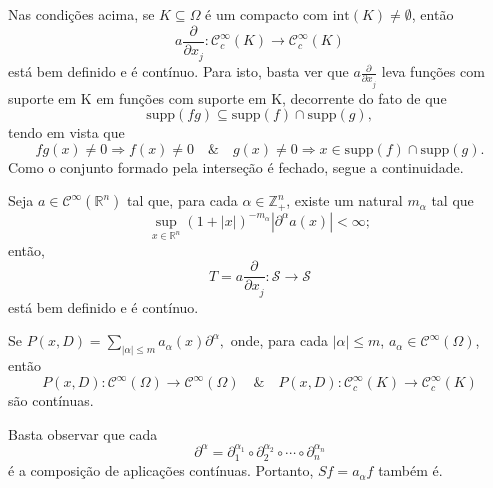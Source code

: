\documentclass[../distribution_theory_notes.tex]{subfiles}
\begin{document}
\begin{example}
	Nas condições acima, se \(K\subseteq \Omega \) é um compacto com \(\mathrm{int}(K)\neq\emptyset\), então
	\[
		a \frac{\partial^{}}{\partial x_{j}^{}}:\mathcal{C}_{c}^{\infty}(K)\rightarrow \mathcal{C}_{c}^{\infty}(K)
	\]
	está bem definido e é contínuo. Para isto, basta ver que \(a \frac{\partial^{}}{\partial x_{j}^{}}\) leva funções com suporte em K em funções com suporte em K, decorrente do fato de que
	\[
		\mathrm{supp}(fg)\subseteq \mathrm{supp}(f)\cap \mathrm{supp}(g),
	\]
	tendo em vista que
	\[
		fg(x)\neq 0 \Rightarrow f(x)\neq 0 \quad\&\quad g(x)\neq 0 \Rightarrow x\in \mathrm{supp}(f)\cap \mathrm{supp}(g).
	\]
	Como o conjunto formado pela interseção é fechado, segue a continuidade.
\end{example}
\begin{example}
	Seja \(a\in \mathcal{C}^{\infty}(\mathbb{R}^{n})\) tal que, para cada \(\alpha \in \mathbb{Z}_{+}^{n}\), existe um natural \(m_{\alpha }\) tal que
	\[
		\sup_{x\in \mathbb{R}^{n}}(1+|x|)^{-m_{\alpha }}|\partial^{\alpha }a(x)|<\infty;
	\]
	então,
	\[
		T = a \frac{\partial^{}}{\partial x_{j}^{}}:\mathcal{S}\rightarrow \mathcal{S}
	\]
	está bem definido e é contínuo.
\end{example}
\begin{theorem*}
	Se \(P(x, D)=\sum\limits_{|\alpha |\leq m}^{}a_{\alpha }(x)\partial^{\alpha },\) onde, para cada \(|\alpha |\leq m\), \(a_{\alpha }\in \mathcal{C}^{\infty}(\Omega )\), então
	\[
		P(x, D):\mathcal{C}^{\infty}(\Omega )\rightarrow \mathcal{C}^{\infty}(\Omega ) \quad\&\quad  P(x, D):\mathcal{C}_{c}^{\infty}(K )\rightarrow \mathcal{C}_{c}^{\infty}(K )
	\]
	são contínuas.
\end{theorem*}
\begin{proof*}
	Basta observar que cada
	\[
		\partial^{\alpha }=\partial_{1}^{\alpha_{1}} \circ\partial_{2}^{\alpha_{2}} \circ\cdots\circ \partial_{n}^{\alpha_{n}}
	\]
	é a composição de aplicações contínuas. Portanto, \(Sf=a_{\alpha }f\) também é. \qedsymbol
\end{proof*}
\end{document}
